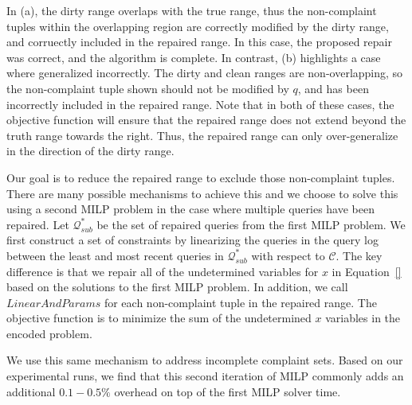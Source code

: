 In (a), the dirty range overlaps with the true range, thus the non-complaint tuples 
within the overlapping region are correctly modified by the dirty range, and corruectly included
in the repaired range.  In this case, the proposed repair was correct, and the algorithm is complete.
In contrast, (b) highlights a case where \sys generalized incorrectly.
The dirty and clean ranges are non-overlapping, so the non-complaint tuple shown should not 
be modified by $q$, and has been incorrectly included in the repaired range.
Note that in both of these cases, the objective function will ensure that the repaired range 
does not extend beyond the truth range towards the right.  Thus, the repaired range
can only over-generalize in the direction of the dirty range.

Our goal is to reduce the repaired range to exclude those non-complaint tuples.  
There are many possible mechanisms to achieve this and we choose to solve this using
a second MILP problem in the case where multiple queries have been repaired.
Let $\mathcal{Q}^*_{sub}$ be the set of repaired queries from the first MILP problem.
We first construct a set of constraints by linearizing the queries in the query log
between the least and most recent queries in $\mathcal{Q}^*_{sub}$ with respect to $\mathcal{C}$.
The key difference is that we repair all of the undetermined variables for $x$ in Equation~\ref{}
based on the solutions to the first MILP problem.  
In addition, we call $LinearAndParams$ for each non-complaint tuple in the repaired range.
The objective function is to minimize the sum of the undetermined $x$ variables in the encoded
problem.

We use this same mechanism to address incomplete complaint sets.
Based on our experimental runs, we find that this second iteration of MILP 
commonly adds an additional $0.1-0.5\%$ overhead on top of the first MILP solver time.




